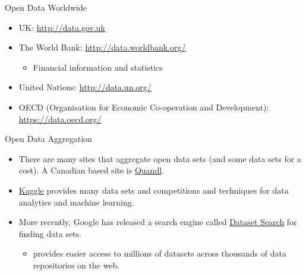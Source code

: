 \documentclass[xcolor=svgnames]{beamer}
\newcommand{\nl}{\\[1em]}
\begin{document}
\begin{frame}{Open Data Worldwide}
\begin{itemize}
\item UK: \url{http://data.gov.uk}\nl

\item The World Bank: \url{http://data.worldbank.org/}
\begin{itemize}
\item Financial information and statistics\nl
\end{itemize}

\item  United Nations: \url{http://data.un.org/}\nl

\item OECD (Organisation for Economic Co-operation and Development): \url{https://data.oecd.org/}

\end{itemize}
\end{frame}


\begin{frame}{Open Data Aggregation}
\begin{itemize}
\item There are many sites that aggregate open data sets (and some data sets for a cost). A Canadian based site is \href{http://www.quandl.com}{Quandl}.\nl

\item \href{https://www.kaggle.com/datasets}{Kaggle} provides many data sets and competitions and techniques for data analytics and machine learning.  \nl

\item More recently, Google has released a search engine called \href{https://toolbox.google.com/datasetsearch}{Dataset Search} for finding data sets. 
\begin{itemize}
\item provides easier access to millions of datasets across thousands of data repositories on the web.
\end{itemize}

\end{itemize}
\end{frame}
\end{document}
